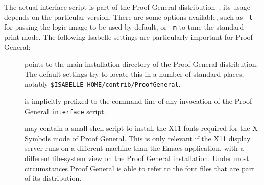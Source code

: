 \begin{isabellebody}
\begin{isamarkuptext}
  The actual interface script is part of the Proof General
  distribution~\cite{proofgeneral}; its usage depends on the
  particular version.  There are some options available, such as
  \verb|-l| for passing the logic image to be used by default,
  or \verb|-m| to tune the standard print mode.  The following
  Isabelle settings are particularly important for Proof General:

  \begin{description}

  \item[\hypertarget{setting.PROOFGENERAL-HOME}{\hyperlink{setting.PROOFGENERAL-HOME}{\mbox{}}}] points to the main
  installation directory of the Proof General distribution.  The
  default settings try to locate this in a number of standard places,
  notably \verb|$ISABELLE_HOME/contrib/ProofGeneral|.

  \item[\hypertarget{setting.PROOFGENERAL-OPTIONS}{\hyperlink{setting.PROOFGENERAL-OPTIONS}{\mbox{}}}] is implicitly prefixed to
  the command line of any invocation of the Proof General \verb|interface| script.

  \item[\hypertarget{setting.XSYMBOL-INSTALLFONTS}{\hyperlink{setting.XSYMBOL-INSTALLFONTS}{\mbox{}}}] may contain a small shell
  script to install the X11 fonts required for the X-Symbols mode of
  Proof General.  This is only relevant if the X11 display server runs
  on a different machine than the Emacs application, with a different
  file-system view on the Proof General installation.  Under most
  circumstances Proof General is able to refer to the font files that
  are part of its distribution.

  \end{description}%
\end{isamarkuptext}%
\isamarkuptrue%
%
\isadelimtheory
%
\endisadelimtheory
%
\isatagtheory
{}\isamarkupfalse%
%
\endisatagtheory
{\isafoldtheory}%
%
\isadelimtheory
%
\endisadelimtheory
\end{isabellebody}%

